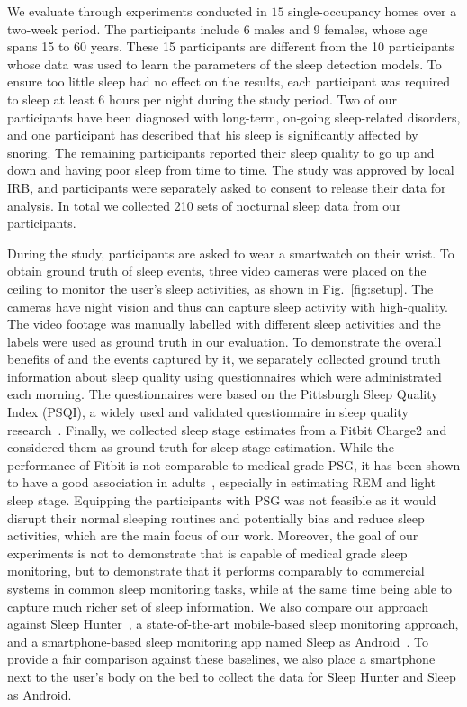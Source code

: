 We evaluate \systemname through experiments conducted in $15$ single-occupancy homes over a two-week period.  The participants include 6 males and 9 females, whose age spans 15 to 60 years. These 15 participants are different from the 10 participants whose data was used to learn the parameters of the sleep detection models. To ensure too little sleep had no effect on the results, each participant was required to sleep at least $6$ hours per night during the study period. Two of our participants have been diagnosed with long-term, on-going sleep-related disorders, and one participant has described that his sleep is significantly affected by snoring. The remaining participants reported their sleep quality to go up and down and having poor sleep from time to time. The study was approved by local IRB, and participants were separately asked to consent to release their data for analysis. In total we collected 210 sets of nocturnal sleep data from our participants. %

During the study, participants are asked to wear a smartwatch on their wrist. To obtain ground truth of sleep events, three video cameras were placed on the ceiling to monitor the user's sleep activities, as shown in Fig.~\ref{fig:setup}. The cameras have night vision and thus can capture sleep activity with high-quality. The video footage was manually labelled with different sleep activities and the labels were used as ground truth in our evaluation. To demonstrate the overall benefits of \systemname and the events captured by it, we separately collected ground truth information about sleep quality using questionnaires which were administrated each morning. The questionnaires were based on the Pittsburgh Sleep Quality Index (PSQI), a widely used and validated questionnaire in sleep quality research~\cite{buysse1989pittsburgh}. Finally, we collected sleep stage estimates from a Fitbit Charge2 and considered them as ground truth for sleep stage estimation. While the performance of Fitbit is not comparable to medical grade PSG, it has been shown to have a good association in adults~\cite{evenson2015systematic,fitbit01,fitbit02,fitbit03}, especially in estimating REM and light sleep stage. Equipping the participants with PSG was not feasible as it would disrupt their normal sleeping routines and potentially bias and reduce sleep activities, which are the main focus of our work. Moreover, the goal of our experiments is not to demonstrate that \systemname is capable of medical grade sleep monitoring, but to demonstrate that it performs comparably to commercial systems in common sleep monitoring tasks, while at the same time being able to capture much richer set of sleep information.  We also compare our approach against Sleep Hunter~\cite{gu2016sleep}, a state-of-the-art mobile-based sleep monitoring approach, and a
smartphone-based sleep monitoring app named Sleep as Android~\cite{SleepAndroid}. To provide a fair comparison against these baselines, we also place a smartphone next to the user's body on the bed to collect the data for Sleep Hunter and Sleep as Android.
	
